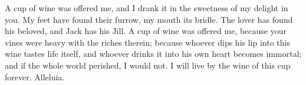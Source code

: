 A cup of wine was offered me, and I drank it in the sweetness of my delight in you. My feet have found their furrow, my mouth its bridle. The lover has found his beloved, and Jack has his Jill. A cup of wine was offered me, because your vines were heavy with the riches therein; because whoever dips his lip into this wine tastes life itself, and whoever drinks it into his own heart becomes immortal; and if the whole world perished, I would not. I will live by the wine of this cup forever. Alleluia.
